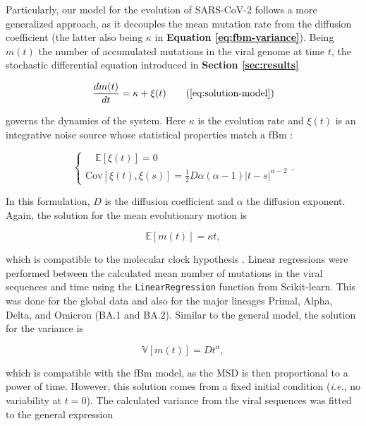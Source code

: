 Particularly, our model for the evolution of SARS-CoV-2 follows a more generalized approach, as it decouples the mean mutation rate from the diffusion coefficient (the latter also being $\kappa$ in \textbf{Equation \ref{eq:fbm-variance}}). Being $m(t)$ the number of accumulated mutations in the viral genome at time $t$, the stochastic differential equation introduced in \textbf{Section \ref{sec:results}}

\begin{equation}
    \frac{dm(t)}{dt}=\kappa + \xi (t)\tag{\ref{eq:solution-model}}
\end{equation}

\noindent governs the dynamics of the system. Here $\kappa$ is the evolution rate and $\xi (t)$ is an integrative noise source whose statistical properties match a fBm \cite{kursawe2013}:

\begin{equation}
    \begin{cases}
        \quad\mathbb{E}\left[\xi (t)\right] = 0\\
        \text{Cov}\left[\xi (t), \xi (s)\right] = \frac{1}{2}D\alpha\left(\alpha - 1\right)\left|t-s\right|^{\alpha - 2}
    \end{cases}.
\end{equation}

In this formulation, $D$ is the diffusion coefficient and $\alpha$ the diffusion exponent. Again, the solution for the mean evolutionary motion is

\begin{equation}
    \mathbb{E}\left[m(t)\right]=\kappa t,
\end{equation}

\noindent which is compatible to the molecular clock hypothesis \cite{ayala1999}. Linear regressions were performed between the calculated mean number of mutations in the viral sequences and time using the \texttt{LinearRegression} function from Scikit-learn. This was done for the global data and also for the major lineages Primal, Alpha, Delta, and Omicron (BA.1 and BA.2). Similar to the general model, the solution for the variance is

\begin{equation}
    \mathbb{V}\left[m(t)\right] = Dt^\alpha,
\end{equation}

\noindent which is compatible with the fBm model, as the MSD is then proportional to a power of time. However, this solution comes from a fixed initial condition (\textit{i.e.}, no variability at $t=0$). The calculated variance from the viral sequences was fitted to the general expression

